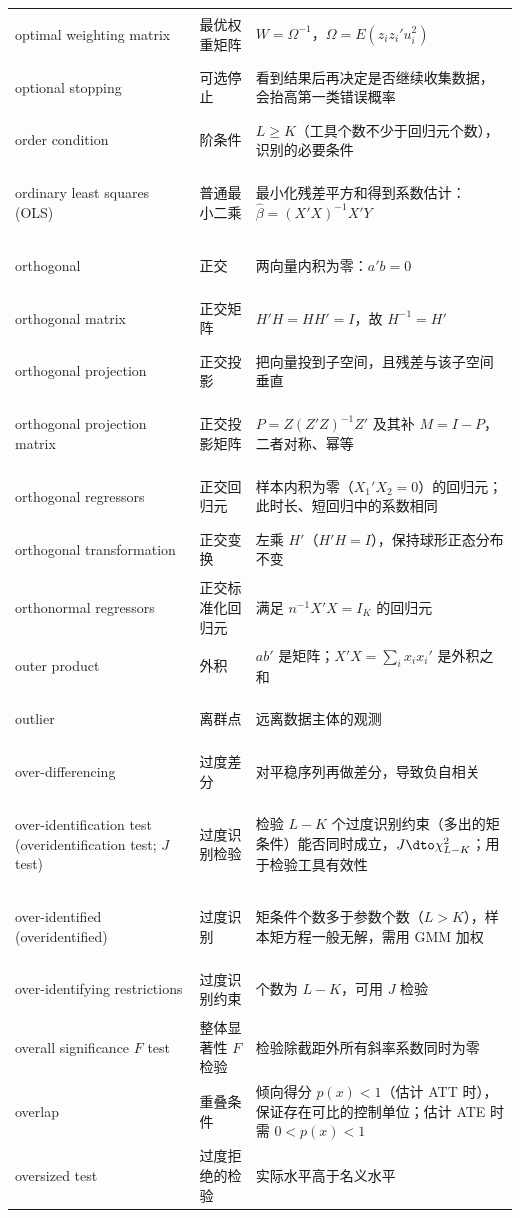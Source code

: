 \begin{longtable}{@{}>{\bfseries\boldmath\raggedright\arraybackslash}p{4.6cm}>{\raggedright\arraybackslash}p{3.2cm}>{\raggedright\arraybackslash}p{\dimexpr\textwidth-7.8cm-4\tabcolsep\relax}@{}}
optimal weighting matrix & 最优权重矩阵 & $W=\Omega^{-1}$，$\Omega=E(z_iz_i'u_i^2)$ \\
optional stopping & 可选停止 & 看到结果后再决定是否继续收集数据，会抬高第一类错误概率 \\
order condition & 阶条件 & $L\ge K$（工具个数不少于回归元个数），识别的必要条件 \\
ordinary least squares (OLS) & 普通最小二乘 & 最小化残差平方和得到系数估计：$\hat\beta=(X'X)^{-1}X'Y$ \\
orthogonal & 正交 & 两向量内积为零：$a'b=0$ \\
orthogonal matrix & 正交矩阵 & $H'H=HH'=I$，故 $H^{-1}=H'$ \\
orthogonal projection & 正交投影 & 把向量投到子空间，且残差与该子空间垂直 \\
orthogonal projection matrix & 正交投影矩阵 & $P=Z(Z'Z)^{-1}Z'$ 及其补 $M=I-P$，二者对称、幂等 \\
orthogonal regressors & 正交回归元 & 样本内积为零（$X_1'X_2=0$）的回归元；此时长、短回归中的系数相同 \\
orthogonal transformation & 正交变换 & 左乘 $H'$（$H'H=I$），保持球形正态分布不变 \\
orthonormal regressors & 正交标准化回归元 & 满足 $n^{-1}X'X=I_K$ 的回归元 \\
outer product & 外积 & $ab'$ 是矩阵；$X'X=\sum_ix_ix_i'$ 是外积之和 \\
outlier & 离群点 & 远离数据主体的观测 \\
over-differencing & 过度差分 & 对平稳序列再做差分，导致负自相关 \\
over-identification test (overidentification test; $J$ test) & 过度识别检验 & 检验 $L-K$ 个过度识别约束（多出的矩条件）能否同时成立，$J\dto\chi^2_{L-K}$；用于检验工具有效性 \\
over-identified (overidentified) & 过度识别 & 矩条件个数多于参数个数（$L>K$），样本矩方程一般无解，需用 GMM 加权 \\
over-identifying restrictions & 过度识别约束 & 个数为 $L-K$，可用 $J$ 检验 \\
overall significance $F$ test & 整体显著性 $F$ 检验 & 检验除截距外所有斜率系数同时为零 \\
overlap & 重叠条件 & 倾向得分 $p(x)<1$（估计 ATT 时），保证存在可比的控制单位；估计 ATE 时需 $0<p(x)<1$ \\
oversized test & 过度拒绝的检验 & 实际水平高于名义水平 \\
\end{longtable}

